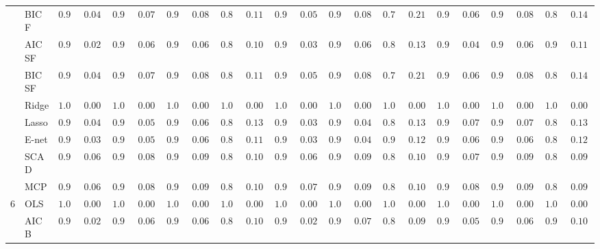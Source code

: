 \begin{tabular}{p{0.2cm}p{1cm}|p{0.6cm}p{0.6cm}|p{0.6cm}p{0.6cm}p{0.6cm}p{0.6cm}p{0.6cm}p{0.6cm}|p{0.6cm}p{0.6cm}p{0.6cm}p{0.6cm}p{0.6cm}p{0.6cm}|p{0.6cm}p{0.6cm}p{0.6cm}p{0.6cm}p{0.6cm}p{0.6cm}}
 & BIC F  & $0.990$ & $0.0438$ & $0.970$ & $0.0718$ & $0.958$ & $0.0819$ & $0.832$ & $0.1162$ & $0.982$ & $0.0575$ & $0.948$ & $0.0882$ & $0.718$ & $0.2148$ & $0.978$ & $0.0629$ & $0.948$ & $0.0882$ & $0.840$ & $0.1477$ \\
 & AIC SF  & $0.998$ & $0.0200$ & $0.980$ & $0.0603$ & $0.978$ & $0.0629$ & $0.898$ & $0.1005$ & $0.994$ & $0.0343$ & $0.972$ & $0.0697$ & $0.854$ & $0.1329$ & $0.988$ & $0.0477$ & $0.972$ & $0.0697$ & $0.902$ & $0.1155$ \\
 & BIC SF  & $0.990$ & $0.0438$ & $0.970$ & $0.0718$ & $0.958$ & $0.0819$ & $0.832$ & $0.1162$ & $0.982$ & $0.0575$ & $0.948$ & $0.0882$ & $0.718$ & $0.2148$ & $0.978$ & $0.0629$ & $0.948$ & $0.0882$ & $0.840$ & $0.1477$ \\
 & Ridge  & $1.000$ & $0.0000$ & $1.000$ & $0.0000$ & $1.000$ & $0.0000$ & $1.000$ & $0.0000$ & $1.000$ & $0.0000$ & $1.000$ & $0.0000$ & $1.000$ & $0.0000$ & $1.000$ & $0.0000$ & $1.000$ & $0.0000$ & $1.000$ & $0.0000$ \\
 & Lasso  & $0.990$ & $0.0438$ & $0.984$ & $0.0545$ & $0.972$ & $0.0697$ & $0.878$ & $0.1360$ & $0.992$ & $0.0394$ & $0.988$ & $0.0477$ & $0.890$ & $0.1314$ & $0.968$ & $0.0737$ & $0.962$ & $0.0789$ & $0.856$ & $0.1336$ \\
 & E-net  & $0.992$ & $0.0394$ & $0.986$ & $0.0513$ & $0.976$ & $0.0653$ & $0.896$ & $0.1188$ & $0.994$ & $0.0343$ & $0.990$ & $0.0438$ & $0.908$ & $0.1285$ & $0.972$ & $0.0697$ & $0.972$ & $0.0697$ & $0.870$ & $0.1283$ \\
 & SCAD  & $0.976$ & $0.0653$ & $0.960$ & $0.0804$ & $0.928$ & $0.0965$ & $0.868$ & $0.1072$ & $0.976$ & $0.0653$ & $0.940$ & $0.0921$ & $0.846$ & $0.1058$ & $0.966$ & $0.0755$ & $0.930$ & $0.0959$ & $0.862$ & $0.0972$ \\
 & MCP  & $0.972$ & $0.0697$ & $0.956$ & $0.0833$ & $0.926$ & $0.0970$ & $0.866$ & $0.1066$ & $0.968$ & $0.0737$ & $0.922$ & $0.0980$ & $0.836$ & $0.1040$ & $0.958$ & $0.0819$ & $0.918$ & $0.0989$ & $0.856$ & $0.0988$ \\\hline
6 & OLS  & $1.000$ & $0.0000$ & $1.000$ & $0.0000$ & $1.000$ & $0.0000$ & $1.000$ & $0.0000$ & $1.000$ & $0.0000$ & $1.000$ & $0.0000$ & $1.000$ & $0.0000$ & $1.000$ & $0.0000$ & $1.000$ & $0.0000$ & $1.000$ & $0.0000$ \\
 & AIC B  & $0.998$ & $0.0200$ & $0.980$ & $0.0603$ & $0.978$ & $0.0629$ & $0.898$ & $0.1005$ & $0.996$ & $0.0281$ & $0.970$ & $0.0718$ & $0.866$ & $0.0945$ & $0.986$ & $0.0513$ & $0.978$ & $0.0629$ & $0.910$ & $0.1040$ \\

\end{tabular}
